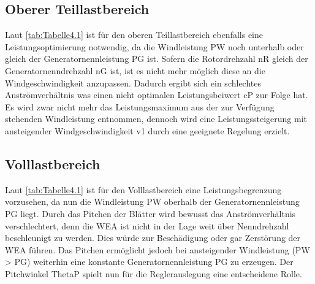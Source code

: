 \subsection{Oberer Teillastbereich}
Laut \autoref{tab:Tabelle4.1} ist für den oberen Teillastbereich ebenfalls eine Leistungsoptimierung notwendig, da die Windleistung \acs{PW} noch unterhalb oder gleich der Generatornennleistung \acs{PG} ist. Sofern die Rotordrehzahl \acs{nR} gleich der Generatornenndrehzahl \acs{nG} ist, ist es nicht mehr möglich diese an die Windgeschwindigkeit anzupassen. Dadurch ergibt sich ein schlechtes Anströmverhältnis was einen nicht optimalen Leistungsbeiwert \acs{cP} zur Folge hat. Es wird zwar nicht mehr das Leistungsmaximum aus der zur Verfügung stehenden Windleistung entnommen, dennoch wird eine Leistungssteigerung mit ansteigender Windgeschwindigkeit \acs{v1} durch eine geeignete Regelung erzielt. 

\subsection{Volllastbereich}

Laut \autoref{tab:Tabelle4.1} ist für den Volllastbereich eine Leistungsbegrenzung vorzusehen, da nun die Windleistung \acs{PW} oberhalb der Generatornennleistung \acs{PG} liegt. Durch das Pitchen der Blätter wird bewusst das Anströmverhältnis verschlechtert, denn die WEA ist nicht in der Lage weit über Nenndrehzahl beschleunigt zu werden. Dies würde zur Beschädigung oder gar Zerstörung der WEA führen. Das Pitchen ermöglicht jedoch bei ansteigender Windleistung (\acs{PW} > \acs{PG}) weiterhin eine konstante Generatornennleistung \acs{PG} zu erzeugen. Der Pitchwinkel \acs{ThetaP} spielt nun für die Reglerauslegung eine entscheidene Rolle.   

